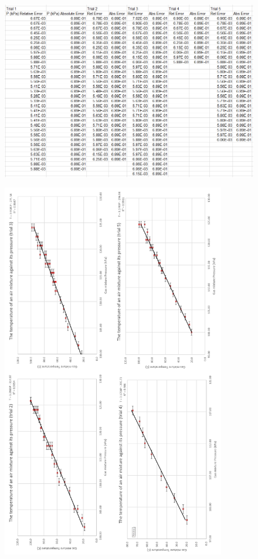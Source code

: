 \documentclass[a4paper,12pt]{article}
\begin{document}
\begin{figure}[H]
    \centering
    \includegraphics[scale=0.55]{assets/unitdata_unc.png}
    \label{fig:upq}
\end{figure}


\begin{figure}[H]
    \centering
    \includegraphics[width=0.87\textwidth]{assets/graphs.png}
    \label{fig:dg25}
\end{figure}
\end{document}
